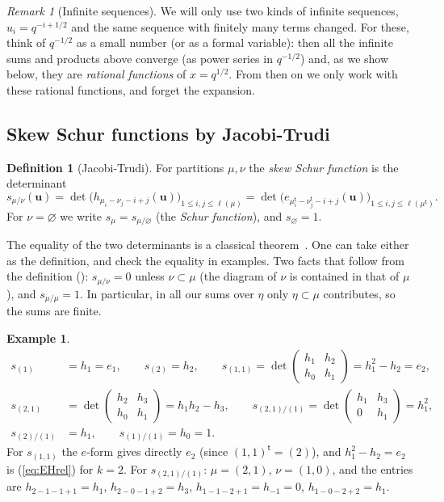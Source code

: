 \documentclass[11pt]{article}
\theoremstyle{plain}
\theoremstyle{definition}
\newtheorem{definition}[theorem]{Definition}
\newtheorem{example}[theorem]{Example}
\theoremstyle{remark}
\newtheorem{remark}[theorem]{Remark}
\newcommand{\vu}{\mathbf{u}}
\newcommand{\es}{\varnothing}
\newcommand{\tr}{{\mathsf t}}
\newcommand{\lt}[1]{#1^{\tr}}
\begin{document}
\begin{remark}[Infinite sequences]
We will only use two kinds of infinite sequences, $u_i=q^{-i+1/2}$ and the same sequence with
finitely many terms changed. For these, think of $q^{-1/2}$ as a small number (or as a formal
variable): then all the infinite sums and products above converge (as power series in $q^{-1/2}$)
and, as we show below, they are \textit{rational functions} of $x=q^{1/2}$. From then on we only
work with these rational functions, and forget the expansion.
\end{remark}

\subsection{Skew Schur functions by Jacobi-Trudi}

\begin{definition}[Jacobi-Trudi]\label{def:JT}
For partitions $\mu,\nu$ the \textit{skew Schur function} is the determinant
\begin{equation}\label{eq:JT}
s_{\mu/\nu}(\vu)=\det\big(h_{\mu_i-\nu_j-i+j}(\vu)\big)_{1\le i,j\le\ell(\mu)}
=\det\big(e_{\lt\mu_i-\lt\nu_j-i+j}(\vu)\big)_{1\le i,j\le\ell(\lt\mu)} .
\end{equation}
For $\nu=\es$ we write $s_\mu=s_{\mu/\es}$ (the \textit{Schur function}), and $s_\es=1$.
\end{definition}

The equality of the two determinants is a classical theorem~\cite[I.(5.5)]{Macdonald}. One
can take either as the definition, and check the equality in examples. Two facts that follow
from the definition (\cite[I.5]{Macdonald}): $s_{\mu/\nu}=0$ unless $\nu\subset\mu$ (the diagram
of $\nu$ is contained in that of $\mu$), and $s_{\mu/\mu}=1$. In particular, in all our sums over
$\eta$ only $\eta\subset\mu$ contributes, so the sums are finite.

\begin{example}\label{ex:smallschur}
\begin{align}
s_{(1)}&=h_1=e_1,\qquad s_{(2)}=h_2,\qquad
s_{(1,1)}=\det\begin{pmatrix}h_1&h_2\\h_0&h_1\end{pmatrix}=h_1^2-h_2=e_2,\\
s_{(2,1)}&=\det\begin{pmatrix}h_2&h_3\\h_0&h_1\end{pmatrix}=h_1h_2-h_3,\qquad
s_{(2,1)/(1)}=\det\begin{pmatrix}h_1&h_3\\0&h_1\end{pmatrix}=h_1^2,\\
s_{(2)/(1)}&=h_1,\qquad s_{(1)/(1)}=h_0=1 .
\end{align}
For $s_{(1,1)}$ the $e$-form gives directly $e_2$ (since $\lt{(1,1)}=(2)$), and $h_1^2-h_2=e_2$
is (\ref{eq:EHrel}) for $k=2$. For $s_{(2,1)/(1)}$: $\mu=(2,1)$, $\nu=(1,0)$, and the entries are
$h_{2-1-1+1}=h_1$, $h_{2-0-1+2}=h_3$, $h_{1-1-2+1}=h_{-1}=0$, $h_{1-0-2+2}=h_1$.
\end{example}
\end{document}
